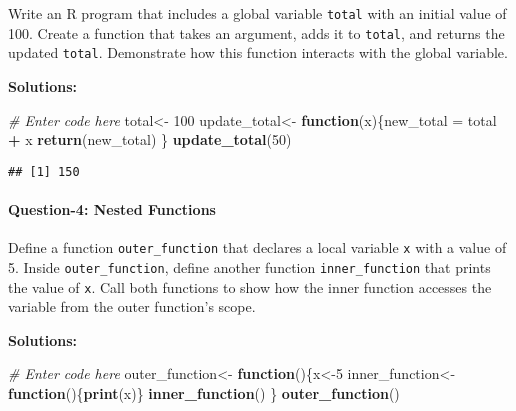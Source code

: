 \documentclass[
]{article}
\newenvironment{Shaded}{\begin{snugshade}}{\end{snugshade}}
\newcommand{\CommentTok}[1]{\textcolor[rgb]{0.56,0.35,0.01}{\textit{#1}}}
\newcommand{\ControlFlowTok}[1]{\textcolor[rgb]{0.13,0.29,0.53}{\textbf{#1}}}
\newcommand{\DecValTok}[1]{\textcolor[rgb]{0.00,0.00,0.81}{#1}}
\newcommand{\FunctionTok}[1]{\textcolor[rgb]{0.13,0.29,0.53}{\textbf{#1}}}
\newcommand{\NormalTok}[1]{#1}
\newcommand{\OtherTok}[1]{\textcolor[rgb]{0.56,0.35,0.01}{#1}}
\newcommand{\SpecialCharTok}[1]{\textcolor[rgb]{0.81,0.36,0.00}{\textbf{#1}}}
\begin{document}
Write an R program that includes a global variable \texttt{total} with
an initial value of 100. Create a function that takes an argument, adds
it to \texttt{total}, and returns the updated \texttt{total}.
Demonstrate how this function interacts with the global variable.

\textbf{Solutions:}

\begin{Shaded}
\begin{Highlighting}[]
\CommentTok{\# Enter code here}
\NormalTok{total}\OtherTok{\textless{}{-}} \DecValTok{100}
\NormalTok{update\_total}\OtherTok{\textless{}{-}} \ControlFlowTok{function}\NormalTok{(x)\{new\_total }\OtherTok{=}\NormalTok{ total }\SpecialCharTok{+}\NormalTok{ x}
\FunctionTok{return}\NormalTok{(new\_total) \}}
\FunctionTok{update\_total}\NormalTok{(}\DecValTok{50}\NormalTok{)}
\end{Highlighting}
\end{Shaded}

\begin{verbatim}
## [1] 150
\end{verbatim}

\hypertarget{question-4-nested-functions}{%
\paragraph{Question-4: Nested
Functions}\label{question-4-nested-functions}}

Define a function \texttt{outer\_function} that declares a local
variable \texttt{x} with a value of 5. Inside \texttt{outer\_function},
define another function \texttt{inner\_function} that prints the value
of \texttt{x}. Call both functions to show how the inner function
accesses the variable from the outer function's scope.

\textbf{Solutions:}

\begin{Shaded}
\begin{Highlighting}[]
\CommentTok{\# Enter code here}
\NormalTok{outer\_function}\OtherTok{\textless{}{-}} \ControlFlowTok{function}\NormalTok{()\{x}\OtherTok{\textless{}{-}}\DecValTok{5} 
\NormalTok{inner\_function}\OtherTok{\textless{}{-}}\ControlFlowTok{function}\NormalTok{()\{}\FunctionTok{print}\NormalTok{(x)\}}
\FunctionTok{inner\_function}\NormalTok{()}
\NormalTok{\}}
\FunctionTok{outer\_function}\NormalTok{()}
\end{Highlighting}
\end{Shaded}
\end{document}
